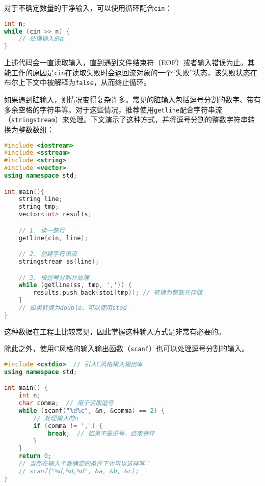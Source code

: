 对于不确定数量的干净输入，可以使用循环配合\texttt{cin}：
\begin{lstlisting}[language=C++]
int n;
while (cin >> n) {
    // 处理输入的n
}
\end{lstlisting}
上述代码会一直读取输入，直到遇到文件结束符（EOF）或者输入错误为止。其能工作的原因是\texttt{cin}在读取失败时会返回流对象的一个“失败”状态，该失败状态在布尔上下文中被解释为\texttt{false}，从而终止循环。

如果遇到脏输入，则情况变得复杂许多。常见的脏输入包括逗号分割的数字、带有多余空格的字符串等。对于这些情况，推荐使用\texttt{getline}配合字符串流（\texttt{stringstream}）来处理。下文演示了这种方式，并将逗号分割的整数字符串转换为整数数组：
\begin{lstlisting}[language=C++]
#include <iostream>
#include <sstream>
#include <string>
#include <vector>
using namespace std;

int main(){
    string line;
    string tmp;
    vector<int> results;

    // 1. 读一整行
    getline(cin, line);

    // 2. 创建字符串流
    stringstream ss(line);

    // 3. 按逗号分割并处理
    while (getline(ss, tmp, ',')) {
        results.push_back(stoi(tmp)); // 转换为整数并存储
    }
    // 如果转换为double，可以使用stod
}
\end{lstlisting}
这种数据在工程上比较常见，因此掌握这种输入方式是非常有必要的。

除此之外，使用C风格的输入输出函数（\texttt{scanf}）也可以处理逗号分割的输入。
\begin{lstlisting}[language=C++]
#include <cstdio>  // 引入C风格输入输出库
using namespace std;

int main() {
    int n;
    char comma;  // 用于读取逗号
    while (scanf("%d%c", &n, &comma) == 2) {
        // 处理输入的n
        if (comma != ',') {
            break;  // 如果不是逗号，结束循环
        }
    }
    return 0;
    // 当然在输入个数确定的条件下也可以这样写：
    // scanf("%d,%d,%d", &a, &b, &c);
}
\end{lstlisting}

